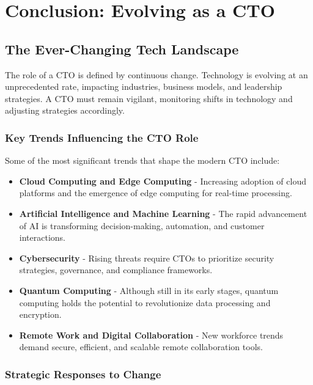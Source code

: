 \chapter{Conclusion: Evolving as a CTO}


\section{The Ever-Changing Tech Landscape}

The role of a CTO is defined by continuous change. Technology is evolving at an unprecedented rate, impacting industries, business models, and leadership strategies. A CTO must remain vigilant, monitoring shifts in technology and adjusting strategies accordingly.

\subsection{Key Trends Influencing the CTO Role}

Some of the most significant trends that shape the modern CTO include:

\begin{itemize}
    \item \textbf{Cloud Computing and Edge Computing} - Increasing adoption of cloud platforms and the emergence of edge computing for real-time processing.
    \item \textbf{Artificial Intelligence and Machine Learning} - The rapid advancement of AI is transforming decision-making, automation, and customer interactions.
    \item \textbf{Cybersecurity} - Rising threats require CTOs to prioritize security strategies, governance, and compliance frameworks.
    \item \textbf{Quantum Computing} - Although still in its early stages, quantum computing holds the potential to revolutionize data processing and encryption.
    \item \textbf{Remote Work and Digital Collaboration} - New workforce trends demand secure, efficient, and scalable remote collaboration tools.
\end{itemize}

\subsection{Strategic Responses to Change}

